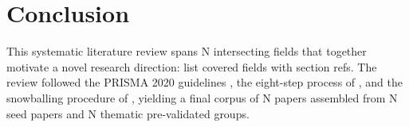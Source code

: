 \section{Conclusion}
\label{sec:conclusion}

This systematic literature review spans N intersecting fields that together
motivate a novel research direction: list covered fields with section refs.
The review followed the PRISMA 2020 guidelines \citep{Page2021}, the eight-step
process of \citet{XiaoWatson2019}, and the snowballing procedure of
\citet{Wohlin2014}, yielding a final corpus of N papers assembled from N
seed papers and N thematic pre-validated groups.

 